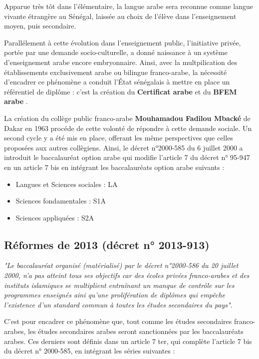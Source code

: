 Apparue très tôt dans l'élémentaire, la langue arabe sera reconnue comme langue vivante étrangère au Sénégal, laissée au choix de l'élève dans l'enseignement moyen, puis secondaire.

Parallélement à cette évolution dans l'enseignement public, l'initiative privée, portée par une demande socio-culturelle, a donné naissance à un système d'enseignement arabe encore embryonnaire.
Ainsi, avec la multpilication des établissements exclusivement arabe ou bilingue franco-arabe, la nécessité d'encadrer ce phénomène a conduit l'État sénégalais à mettre en place un référentiel de diplôme : 
c'est la création du \textbf{Certificat arabe} et du \textbf{BFEM arabe} \cite{decret2000}.

La création du collège public franco-arabe \textbf{Mouhamadou Fadilou Mbacké} de Dakar en 1963 procéde de cette volonté de répondre à cette demande sociale. Un second cycle y a été mis en place, offerant les même perspectives que celles proposées aux autres collègiens.
Ainsi, le décret n°2000-585 du 6 juillet 2000 a introduit le baccalauréat option arabe qui modifie l'article 7 du décret n° 95-947 en un article 7 bis en intégrant les baccalauréats option arabe suivants : 

\begin{itemize}
    \item Langues et Sciences sociales : LA
    \item Sciences fondamentales : S1A
    \item Sciences appliquées : S2A
\end{itemize}

\subsection{Réformes de 2013 (décret n° 2013-913)}

\textit{"Le baccalauréat organisé (matérialisé) par le décret n°2000-586 du 20 juillet 2000, 
n'a pas atteint tous ses objectifs car des écoles privées franco-arabes et des instituts islamiques se multiplient entraînant un manque de contrôle
sur les programmes enseignés aini qu'une prolifération de diplômes qui empêche l'existence d'un standard commun à toutes les études secondaires du pays"}\cite{decret2013}.

C'est pour encadrer ce phénomène que, tout comme les études secondaires franco-arabes, les études secondaires arabes seront sanctionnées par les baccalauréats arabes. 
Ces derniers sont définis dans un article 7 ter, qui complète l'article 7 bis du décret n° 2000-585, en intégrant les séries suivantes :

